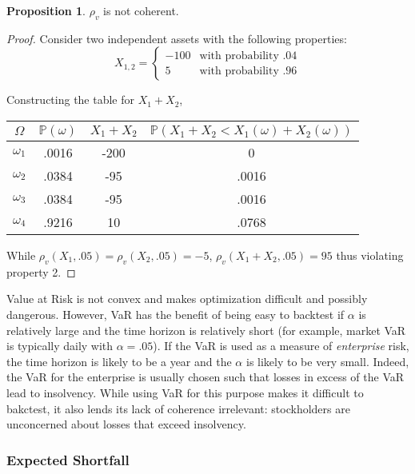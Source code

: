 \documentclass[12pt]{article}
\theoremstyle{definition}
\newtheorem{prop}{Proposition}
\begin{document}
\begin{prop}
\(\rho_v\) is not coherent.
\end{prop}
\begin{proof}
Consider two independent assets with the following properties:
\[X_{1, 2}=\begin{cases}
-100 & \text{with probability .04}\\
5 & \text{with probability .96}

\end{cases} \]

Constructing the table for \(X_1+X_2\), 

\begin{center}
\begin{tabular}{c|  c c c}
\(\Omega\) & \(\mathbb{P}(\omega)\) & \(X_1+X_2\) &  \(\mathbb{P}(X_1+X_2 < X_1(\omega)+X_2(\omega))\)  \\
\hline
\(\omega_1\) & .0016 & -200 & 0 \\
\(\omega_2\) & .0384 & -95 & .0016\\
\(\omega_3\) & .0384 & -95 & .0016 \\
\(\omega_4\) & .9216 & 10 & .0768 \\
\end{tabular}
\end{center}


While \(\rho_v (X_1, .05)=\rho_v (X_2, .05)=-5\), \(\rho_v (X_1+X_2, .05)=95\) thus violating property 2.

\end{proof}

Value at Risk is not convex and makes optimization difficult and possibly dangerous. However, VaR has the benefit of being easy to backtest if \(\alpha\) is relatively large and the time horizon is relatively short (for example, market VaR is typically daily with \(\alpha=.05\)).  If the VaR is used as a measure of \emph{enterprise} risk, the time horizon is likely to be a year and the \(\alpha\) is likely to be very small.  Indeed, the VaR for the enterprise is usually chosen such that losses in excess of the VaR lead to insolvency.  While using VaR for this purpose makes it difficult to bakctest, it also lends its lack of coherence irrelevant: stockholders are unconcerned about losses that exceed insolvency.

\subsubsection{Expected Shortfall}
\end{document}
